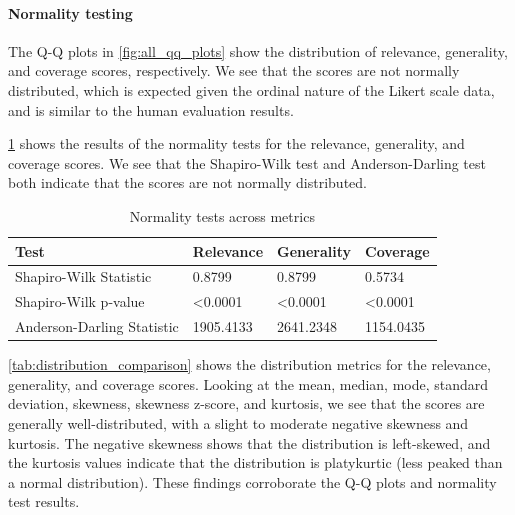\paragraph{Normality testing}
The Q-Q plots in \cref{fig:all_qq_plots} show the distribution of relevance, generality, and coverage scores, respectively. We see that the scores are not normally distributed, which is expected given the ordinal nature of the Likert scale data, and is similar to the human evaluation results.

\cref{tab:normality_comparison} shows the results of the normality tests for the relevance, generality, and coverage scores. We see that the Shapiro-Wilk test and Anderson-Darling test both indicate that the scores are not normally distributed.

\begin{table}[htbp]
    \centering
    \caption{Normality tests across metrics}
    \begin{tabular}{llll}
        \hline
        \textbf{Test} & \textbf{Relevance} & \textbf{Generality} & \textbf{Coverage} \\
        \hline
        Shapiro-Wilk Statistic & 0.8799 & 0.8799 & 0.5734 \\
        Shapiro-Wilk p-value & <0.0001 & <0.0001 & <0.0001 \\
        Anderson-Darling Statistic & 1905.4133 & 2641.2348 & 1154.0435 \\
        \hline
    \end{tabular}
    \label{tab:normality_comparison}
\end{table}

\cref{tab:distribution_comparison} shows the distribution metrics for the relevance, generality, and coverage scores. Looking at the mean, median, mode, standard deviation, skewness, skewness z-score, and kurtosis, we see that the scores are generally well-distributed, with a slight to moderate negative skewness and kurtosis. The negative skewness shows that the distribution is left-skewed, and the kurtosis values indicate that the distribution is platykurtic (less peaked than a normal distribution). These findings corroborate the Q-Q plots and normality test results.

